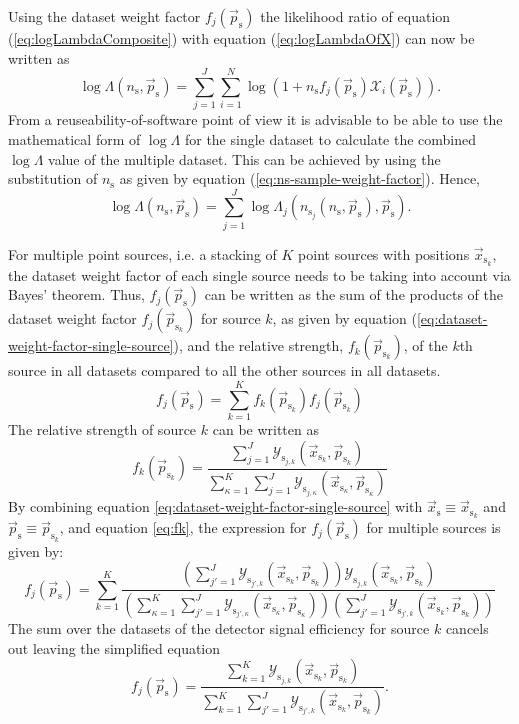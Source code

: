 \documentclass{article}
\newcommand{\eq}[1]{(\ref{#1})}
\newcommand{\ns}{n_{\mathrm{s}}}
\newcommand{\ps}{\vec{p}_{\mathrm{s}}}
\newcommand{\psk}{\vec{p}_{\mathrm{s}_k}}
\newcommand{\xs}{\vec{x}_{\mathrm{s}}}
\newcommand{\xsk}{\vec{x}_{\mathrm{s}_k}}
\begin{document}
Using the dataset weight factor $f_{j}(\ps)$ the likelihood ratio of
equation \eq{eq:logLambdaComposite} with equation \eq{eq:logLambdaOfX} can now
be written as
\begin{equation}
 \log \Lambda(\ns,\ps) = \sum_{j=1}^{J} \sum_{i=1}^{N} \log (1 + \ns f_{j}(\ps)\mathcal{X}_i(\ps)).
\end{equation}
From a reuseability-of-software point of view it is advisable to be able to use
the mathematical form of $\log \Lambda$ for the single dataset to calculate the
combined $\log \Lambda$ value of the multiple dataset. This can be achieved by
using the substitution of $\ns$ as given by equation (\ref{eq:ns-sample-weight-factor}).
Hence,
\begin{equation}
 \log \Lambda(\ns,\ps) = \sum_{j=1}^{J} \log \Lambda_j(n_{\mathrm{s}_j}(\ns,\ps),\ps).
 \label{eq:logLambdaOfLogLambdaj}
\end{equation}

For multiple point sources, i.e. a stacking of $K$ point sources with positions
$\xsk$, the dataset weight factor of each single source needs
to be taking into account via Bayes' theorem. Thus, $f_{j}(\ps)$ can be written
as the sum of the products of the dataset weight factor $f_{j}(\psk)$ for
source $k$, as given by equation (\ref{eq:dataset-weight-factor-single-source}),
and the relative strength, $f_{k}(\psk)$, of the $k$th source in all datasets
compared to all the other sources in all datasets.
\begin{equation}
 f_{j}(\ps) = \sum_{k=1}^{K} f_{k}(\psk) f_{j}(\psk)
\end{equation}
The relative strength of source $k$ can be written as
\begin{equation}
 f_{k}(\psk) = \frac{\sum_{j=1}^{J} \mathcal{Y}_{\mathrm{s}_{j,k}}(\xsk,\psk)}{\sum_{\kappa=1}^{K} \sum_{j=1}^{J} \mathcal{Y}_{\mathrm{s}_{j,\kappa}}(\vec{x}_{\mathrm{s}_\kappa},\vec{p}_{\mathrm{s}_\kappa}) }
 \label{eq:fk}
\end{equation}
By combining equation \ref{eq:dataset-weight-factor-single-source} with $\xs \equiv \xsk$
and $\ps \equiv \psk$, and equation \ref{eq:fk}, the expression for
$f_{j}(\ps)$ for multiple sources is given by:
\begin{equation}
 f_{j}(\ps) = \sum_{k=1}^{K}
    \frac{\left(\sum_{j'=1}^{J} \mathcal{Y}_{\mathrm{s}_{j',k}}(\xsk,\psk)\right) \mathcal{Y}_{\mathrm{s}_{j,k}}(\xsk,\psk)}
         {\left(\sum_{\kappa=1}^{K} \sum_{j'=1}^{J} \mathcal{Y}_{\mathrm{s}_{j',\kappa}}(\vec{x}_{\mathrm{s}_\kappa},\vec{p}_{\mathrm{s}_\kappa})\right) \left( \sum_{j'=1}^{J} \mathcal{Y}_{\mathrm{s}_{j',k}}(\xsk,\psk) \right)}
\end{equation}
The sum over the datasets of the detector signal efficiency for source $k$ cancels
out leaving the simplified equation
\begin{equation}
 f_{j}(\ps) = \frac{\sum_{k=1}^{K} \mathcal{Y}_{\mathrm{s}_{j,k}}(\xsk,\psk)}
                   {\sum_{k=1}^{K} \sum_{j'=1}^{J} \mathcal{Y}_{\mathrm{s}_{j',k}}(\xsk,\psk)}.
 \label{eq:dataset-weight-factor-multiple-sources}
\end{equation}
\end{document}
